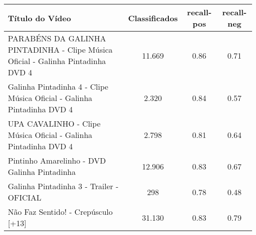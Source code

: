 \begin{table}[H]
	
\begin{tabular}{|p{5.5cm}|c|c|c|}
\hline
\textbf{Título do Vídeo} & \textbf{Classificados} & \textbf{recall-pos} & \textbf{recall-neg} \\ \hline
PARABÉNS DA GALINHA PINTADINHA - Clipe Música Oficial - Galinha Pintadinha DVD 4 & 11.669 & 0.86 & 0.71 \\ \hline
Galinha Pintadinha 4 - Clipe Música Oficial - Galinha Pintadinha DVD 4 & 2.320 & 0.84 & 0.57 \\ \hline
UPA CAVALINHO - Clipe Música Oficial - Galinha Pintadinha DVD 4 & 2.798 & 0.81 & 0.64 \\ \hline
Pintinho Amarelinho - DVD Galinha Pintadinha & 12.906 & 0.83 & 0.67 \\ \hline
Galinha Pintadinha 3 - Trailer - OFICIAL & 298 & 0.78 & 0.48 \\ \hline
Não Faz Sentido! - Crepúsculo [+13] & 31.130 & 0.83 & 0.79\\ \hline
\end{tabular}

\end{table}

\begin{comment}
As ferramentas que serão utilizadas para mineração e classificação serão o scikit-learn\footnote{http://scikit-learn.org} e Natural Language Toolkit\footnote{http://www.nltk.org/} (NLTK). NLTK é uma ferramenta para criação de programas em Python para processamento de linguagem humana. scikit-learn é um framework de aplicações multi-propósito, que pode também ser utilizado para pré-processamento, mineração e análise de dados. 
\end{comment}
